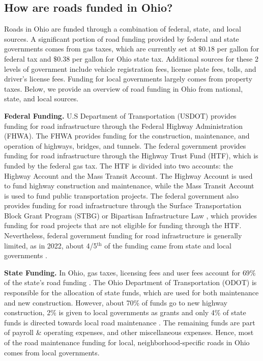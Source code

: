 \subsection{How are roads funded in Ohio?}

Roads in Ohio are funded through a combination of federal, state, and local sources. A significant portion of road funding provided by federal and state governments comes from gas taxes, which are currently set at $\$0.18$ per gallon for federal tax and $\$0.38$ per gallon for Ohio state tax. Additional sources for these 2 levels of government include vehicle registration fees, license plate fees, tolls, and driver's license fees. Funding for local governments largely comes from property taxes. Below, we provide an overview of road funding in Ohio from national, state, and local sources.

{\bf Federal Funding.} U.S Department of Transportation (USDOT) provides funding for road infrastructure through the Federal Highway Administration (FHWA). The FHWA provides funding for the construction, maintenance, and operation of highways, bridges, and tunnels. The federal government provides funding for road infrastructure through the Highway Trust Fund (HTF), which is funded by the federal gas tax. The HTF is divided into two accounts: the Highway Account and the Mass Transit Account. The Highway Account is used to fund highway construction and maintenance, while the Mass Transit Account is used to fund public transportation projects. The federal government also provides funding for road infrastructure through the Surface Transportation Block Grant Program (STBG) or Bipartisan Infrastructure Law \citep{USDOT_BIL_Ohio}, which provides funding for road projects that are not eligible for funding through the HTF. Nevertheless, federal government funding for road infrastructure is generally limited, as in 2022, about 4/5$^\text{th}$ of the funding came from state and local governments \citep{pgpf_htf_explained}.

{\bf State Funding.}
In Ohio, gas taxes, licensing fees and user fees account for $69\%$ of the state's road funding \citep{boesen2021}. The Ohio Department of Transportation (ODOT) is responsible for the allocation of state funds, which are used for both maintenance and new construction. However, about 70\% of funds go to new highway construction, 2\% is given to local governments as grants and only 4\% of state funds is directed towards local road maintenance \citep{odot2023}. The remaining funds are part of payroll \& operating expenses, and other miscellaneous expenses. Hence, most of the road maintenance funding for local, neighborhood-specific roads in Ohio comes from local governments.


